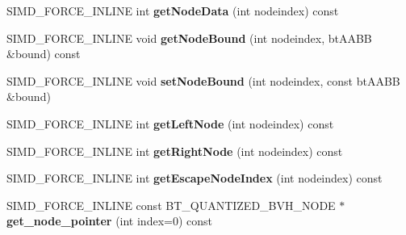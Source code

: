 \begin{DoxyCompactItemize}
S\+I\+M\+D\+\_\+\+F\+O\+R\+C\+E\+\_\+\+I\+N\+L\+I\+NE int {\bfseries get\+Node\+Data} (int nodeindex) const
\item 
\mbox{\label{classbtQuantizedBvhTree_a81bcb1746b0053b0f3a36ad33cd2b91c}} 
S\+I\+M\+D\+\_\+\+F\+O\+R\+C\+E\+\_\+\+I\+N\+L\+I\+NE void {\bfseries get\+Node\+Bound} (int nodeindex, bt\+A\+A\+BB \&bound) const
\item 
\mbox{\label{classbtQuantizedBvhTree_ad2904559dc545e9839112486d97fbe17}} 
S\+I\+M\+D\+\_\+\+F\+O\+R\+C\+E\+\_\+\+I\+N\+L\+I\+NE void {\bfseries set\+Node\+Bound} (int nodeindex, const bt\+A\+A\+BB \&bound)
\item 
\mbox{\label{classbtQuantizedBvhTree_aa38e3dbb5dfff41f742bbfed5e730932}} 
S\+I\+M\+D\+\_\+\+F\+O\+R\+C\+E\+\_\+\+I\+N\+L\+I\+NE int {\bfseries get\+Left\+Node} (int nodeindex) const
\item 
\mbox{\label{classbtQuantizedBvhTree_a02c5fb172851eb8fb44611eba4c2b366}} 
S\+I\+M\+D\+\_\+\+F\+O\+R\+C\+E\+\_\+\+I\+N\+L\+I\+NE int {\bfseries get\+Right\+Node} (int nodeindex) const
\item 
\mbox{\label{classbtQuantizedBvhTree_a5e2e3a1de3f78357d0724ee250b19202}} 
S\+I\+M\+D\+\_\+\+F\+O\+R\+C\+E\+\_\+\+I\+N\+L\+I\+NE int {\bfseries get\+Escape\+Node\+Index} (int nodeindex) const
\item 
\mbox{\label{classbtQuantizedBvhTree_affade16655e2665052f5fc7ce405ff04}} 
S\+I\+M\+D\+\_\+\+F\+O\+R\+C\+E\+\_\+\+I\+N\+L\+I\+NE const B\+T\+\_\+\+Q\+U\+A\+N\+T\+I\+Z\+E\+D\+\_\+\+B\+V\+H\+\_\+\+N\+O\+DE $\ast$ {\bfseries get\+\_\+node\+\_\+pointer} (int index=0) const
\end{DoxyCompactItemize}

